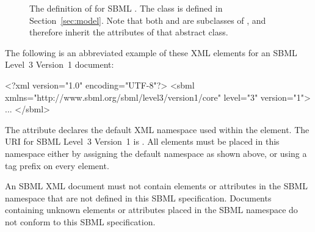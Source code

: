 \begin{figure}[htb]
  \centering
  \small
  \vspace*{-2ex}
  \caption{The definition of \Sbml for SBML \thisLV.
      The class \Model is defined in Section~\ref{sec:model}.
      Note that both \Sbml and \Model are subclasses of \SBase,
      and therefore inherit the attributes of that abstract
      class.}
  \label{fig:sbml}
\end{figure}

The following is an abbreviated example of these XML elements for
an SBML Level~3 Version~1 document:

\begin{example}
<?xml version="1.0" encoding="UTF-8"?>
<sbml xmlns="http://www.sbml.org/sbml/level3/version1/core" level="3" version="1">
  ...
</sbml>
\end{example}

The attribute  declares the default XML namespace
used within the  element.  The URI for SBML Level~3 Version~1
is .  All
elements must be placed in this namespace either by assigning the
default namespace as shown above, or using a tag prefix on
every element.

An SBML XML document must not contain elements or attributes in
the SBML namespace that are not defined in this SBML \thisLVR
specification.  Documents containing unknown elements or
attributes placed in the SBML namespace do not conform to this
SBML specification.

